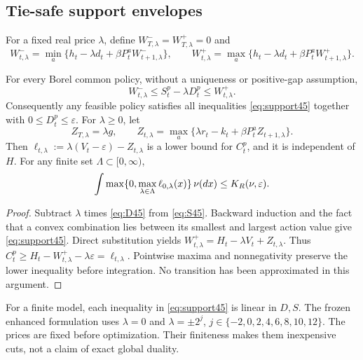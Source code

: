 \subsection{Tie-safe support envelopes}\label{sec:support45}
For a fixed real price $\lambda$, define $W_{T,\lambda}^-=W_{T,\lambda}^+=0$ and
\begin{equation}\label{eq:W45}
 W_{t,\lambda}^{-}=\min_a\{h_t-\lambda d_t+\beta P_t^aW_{t+1,\lambda}^{-}\},\qquad
 W_{t,\lambda}^{+}=\max_a\{h_t-\lambda d_t+\beta P_t^aW_{t+1,\lambda}^{+}\}.
\end{equation}
\begin{theorem}\label{thm:support45}
For every Borel common policy, without a uniqueness or positive-gap assumption,
\begin{equation}\label{eq:support45}
 W_{t,\lambda}^{-}\le S_t^p-\lambda D_t^p\le W_{t,\lambda}^{+}.
\end{equation}
Consequently any feasible policy satisfies all inequalities \eqref{eq:support45} together with $0\le D_t^p\le\varepsilon$. For $\lambda\ge0$, let
\begin{equation}\label{eq:Z45}
 Z_{T,\lambda}=\lambda g,\qquad
 Z_{t,\lambda}=\max_a\{\lambda r_t-k_t+\beta P_t^aZ_{t+1,\lambda}\}.
\end{equation}
Then $\ell_{t,\lambda}:=\lambda(V_t-\varepsilon)-Z_{t,\lambda}$ is a lower bound for $C_t^p$, and it is independent of $H$. For any finite set $\Lambda\subset[0,\infty)$,
\begin{equation}\label{eq:supportlower45}
 \int\max\{0,\max_{\lambda\in\Lambda}\ell_{0,\lambda}(x)\}\,\nu(dx)
 \le K_R(\nu,\varepsilon).
\end{equation}
\end{theorem}
\begin{proof}
Subtract $\lambda$ times \eqref{eq:D45} from \eqref{eq:S45}. Backward induction and the fact that a convex combination lies between its smallest and largest action value give \eqref{eq:support45}. Direct substitution yields $W_{t,\lambda}^+=H_t-\lambda V_t+Z_{t,\lambda}$. Thus $C_t^p\ge H_t-W_{t,\lambda}^+-\lambda\varepsilon=\ell_{t,\lambda}$. Pointwise maxima and nonnegativity preserve the lower inequality before integration. No transition has been approximated in this argument.
\end{proof}
For a finite model, each inequality in \eqref{eq:support45} is linear in $D,S$. The frozen enhanced formulation uses $\lambda=0$ and $\lambda=\pm2^j$, $j\in\{-2,0,2,4,6,8,10,12\}$. The prices are fixed before optimization. Their finiteness makes them inexpensive cuts, not a claim of exact global duality.

